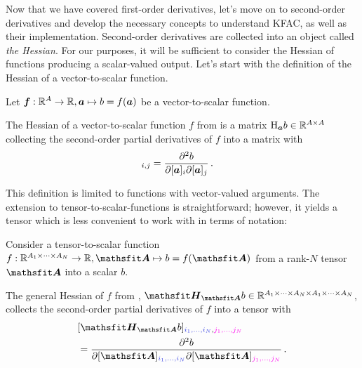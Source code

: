 Now that we have covered first-order derivatives, let's move on to second-order derivatives and develop the necessary concepts to understand KFAC, as well as their implementation.
Second-order derivatives are collected into an object called \emph{the Hessian}.
For our purposes, it will be sufficient to consider the Hessian of functions producing a scalar-valued output.
Let's start with the definition of the Hessian of a vector-to-scalar function.

\begin{setup}\label{setup:vector_to_scalar_function}
  Let ${\bm{f}}: {\mathbb{R}}^A \to {\mathbb{R}}, {\bm{a}} \mapsto b = f({\bm{a}})$ be a vector-to-scalar function.
\end{setup}

\begin{definition}\label{def:vector_hessian}
  The Hessian of a vector-to-scalar function $f$ from  is a matrix $\mathrm{H}_{{\bm{a}}}b \in {\mathbb{R}}^{A \times A}$ collecting the second-order partial derivatives of $f$ into a matrix with
  \begin{align*}
    [\hess_{\va}b]_{i,j}
     & =
    \frac{\partial^2 b}{\partial [\va]_i \partial [\va]_j}\,.
  \end{align*}
\end{definition}
This definition is limited to functions with vector-valued arguments. The extension to tensor-to-scalar-functions is straightforward; however, it yields a tensor which is less convenient to work with in terms of notation:

\begin{setup}\label{setup:hessians}
  Consider a tensor-to-scalar function $f: \sR^{A_1 \times \dots \times A_N} \to \sR, \tA \mapsto b = f(\tA)$ from a rank-$N$ tensor $\tA$ into a scalar $b$.
\end{setup}

\begin{definition}\label{def:general_hessian}
  The general Hessian of $f$ from , $\tH_{\tA}b \in \sR^{A_1 \times \dots \times A_N \times A_1 \times \dots \times A_N}$, collects the second-order partial derivatives of $f$ into a tensor with
  \begin{align*}
     & [\tH_{\tA}b]_{\colored{i_1, \dots, i_N}, \colored[VectorPink]{j_1, \dots, j_N}}
    \\
     & =
    \frac{\partial^2 b}{\partial [\tA]_{\colored{i_1, \dots, i_N}} \partial [\tA]_{\colored[VectorPink]{j_1, \dots, j_N}}}\,.
  \end{align*}
\end{definition}

